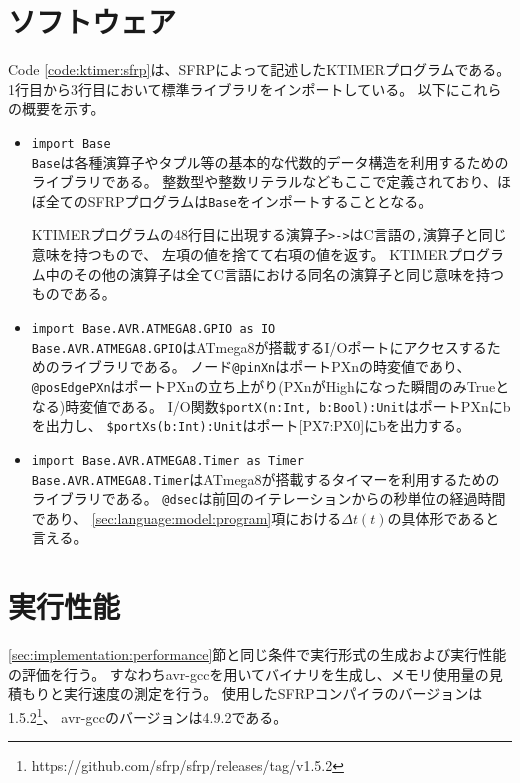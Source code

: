 \clearpage
\section{ソフトウェア}
Code \ref{code:ktimer:sfrp}は、SFRPによって記述したKTIMERプログラムである。
1行目から3行目において標準ライブラリをインポートしている。
以下にこれらの概要を示す。

\begin{itemize}
  \item \texttt{import Base}\\
  \texttt{Base}は各種演算子やタプル等の基本的な代数的データ構造を利用するためのライブラリである。
  整数型や整数リテラルなどもここで定義されており、ほぼ全てのSFRPプログラムは\texttt{Base}をインポートすることとなる。

  KTIMERプログラムの48行目に出現する演算子\texttt{>->}はC言語の\texttt{,}演算子と同じ意味を持つもので、
  左項の値を捨てて右項の値を返す。
  KTIMERプログラム中のその他の演算子は全てC言語における同名の演算子と同じ意味を持つものである。

  \item \texttt{import Base.AVR.ATMEGA8.GPIO as IO}\\
  \texttt{Base.AVR.ATMEGA8.GPIO}はATmega8が搭載するI/Oポートにアクセスするためのライブラリである。
  ノード\texttt{@pinXn}はポートPXnの時変値であり、
  \texttt{@posEdgePXn}はポートPXnの立ち上がり(PXnがHighになった瞬間のみTrueとなる)時変値である。
  I/O関数\texttt{\$portX(n:Int, b:Bool):Unit}はポートPXnにbを出力し、
  \texttt{\$portXs(b:Int):Unit}はポート[PX7:PX0]にbを出力する。

  \item \texttt{import Base.AVR.ATMEGA8.Timer as Timer}\\
  \texttt{Base.AVR.ATMEGA8.Timer}はATmega8が搭載するタイマーを利用するためのライブラリである。
  \texttt{@dsec}は前回のイテレーションからの秒単位の経過時間であり、
  \ref{sec:language:model:program}項における$\Delta t(t)$の具体形であると言える。
\end{itemize}


\clearpage


\section{実行性能}
\ref{sec:implementation:performance}節と同じ条件で実行形式の生成および実行性能の評価を行う。
すなわちavr-gccを用いてバイナリを生成し、メモリ使用量の見積もりと実行速度の測定を行う。
使用したSFRPコンパイラのバージョンは1.5.2\footnote{https://github.com/sfrp/sfrp/releases/tag/v1.5.2}、
avr-gccのバージョンは4.9.2である。

